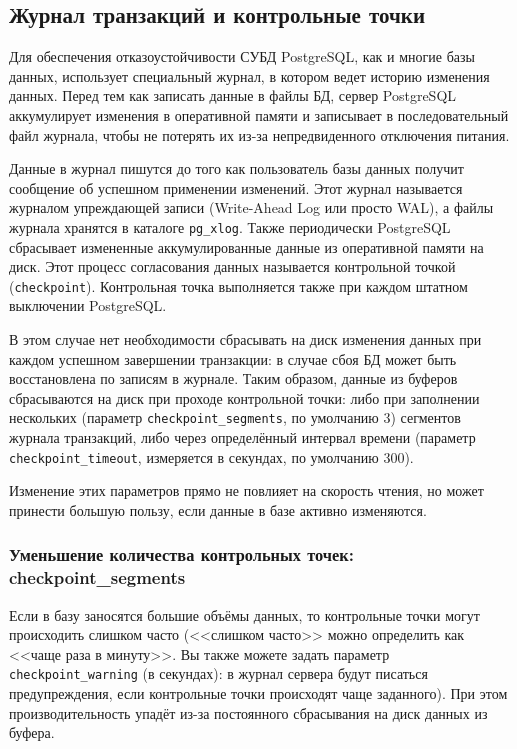 \subsection{Журнал транзакций и контрольные точки}


Для обеспечения отказоустойчивости СУБД PostgreSQL, как и многие базы данных, использует специальный журнал, в котором ведет историю изменения данных. Перед тем как записать данные в файлы БД, сервер PostgreSQL аккумулирует изменения в оперативной памяти и записывает в последовательный файл журнала, чтобы не потерять их из-за непредвиденного отключения питания.

Данные в журнал пишутся до того как пользователь базы данных получит сообщение об успешном применении изменений. Этот журнал называется журналом упреждающей записи (Write-Ahead Log или просто WAL), а файлы журнала хранятся в каталоге \lstinline!pg_xlog!. Также периодически PostgreSQL сбрасывает измененные аккумулированные данные из оперативной памяти на диск. Этот процесс согласования данных называется контрольной точкой (\lstinline!checkpoint!). Контрольная точка выполняется также при каждом штатном выключении PostgreSQL.

В этом случае нет необходимости сбрасывать на диск изменения данных при каждом успешном завершении транзакции: в случае сбоя БД может быть восстановлена по записям в журнале. Таким образом, данные из буферов сбрасываются на диск при проходе контрольной точки: либо при заполнении нескольких (параметр \lstinline!checkpoint_segments!, по умолчанию 3) сегментов журнала транзакций, либо через определённый интервал времени (параметр \lstinline!checkpoint_timeout!, измеряется в секундах, по умолчанию 300).

Изменение этих параметров прямо не повлияет на скорость чтения, но может принести большую пользу, если данные в базе активно изменяются.


\subsubsection{Уменьшение количества контрольных точек: checkpoint\_segments}


Если в базу заносятся большие объёмы данных, то контрольные точки могут происходить слишком часто (<<слишком часто>> можно определить как <<чаще раза в минуту>>. Вы также можете задать параметр \lstinline!checkpoint_warning! (в секундах): в журнал сервера будут писаться предупреждения, если контрольные точки происходят чаще заданного). При этом производительность упадёт из-за постоянного сбрасывания на диск данных из буфера.

